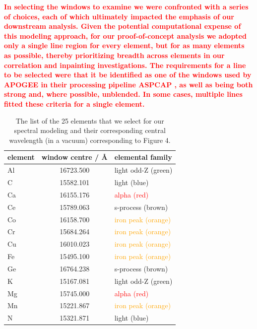 \documentclass[a4paper,fleqn,usenatbib]{mnras}
\newcommand\edit[1]{\textcolor{red}{\textbf{#1}}}
\begin{document}
\edit{In selecting the windows to examine we were confronted with a series of choices, each of which ultimately impacted the emphasis of our downstream analysis. Given the potential computational expense of this modeling approach, for our proof-of-concept analysis we adopted only a single line region for every element, but for as many elements as possible, thereby prioritizing breadth across elements in our correlation and inpainting investigations. The requirements for a line to be selected were that it be identified as one of the windows used by APOGEE in their processing pipeline ASPCAP \citep{GP2015}, as well as being both strong and, where possible, unblended. In some cases, multiple lines fitted these criteria for a single element.}

\begin{table}
    \centering
    \caption{The list of the 25 elements that we select for our spectral modeling and their corresponding central wavelength (in a vacuum) corresponding to Figure 4.}
    \label{tab:window_centres}
    \begin{tabular}{lcl}
        \hline
        element & window centre / \AA & elemental family \\
        \hline
        Al & 16723.500 & \textcolor{OliveGreen}{light odd-Z (green)} \\
        C & 15582.101 & \textcolor{NavyBlue}{light (blue)} \\
        Ca & 16155.176 & \textcolor{red}{alpha (red)} \\
        Ce & 15789.063 & \textcolor{Sepia}{s-process (brown)} \\
        Co & 16158.700 & \textcolor{orange}{iron peak (orange)} \\
        Cr & 15684.264 & \textcolor{orange}{iron peak (orange)} \\
        Cu & 16010.023 & \textcolor{orange}{iron peak (orange)} \\
        Fe & 15495.100 & \textcolor{orange}{iron peak (orange)} \\
        Ge & 16764.238 & \textcolor{Sepia}{s-process (brown)} \\
        K & 15167.081 & \textcolor{OliveGreen}{light odd-Z (green)} \\
        Mg & 15745.000 & \textcolor{red}{alpha (red)} \\
        Mn & 15221.867 & \textcolor{orange}{iron peak (orange)} \\
        N & 15321.871 & \textcolor{NavyBlue}{light (blue)} \\

\end{tabular}
\end{table}
\end{document}
